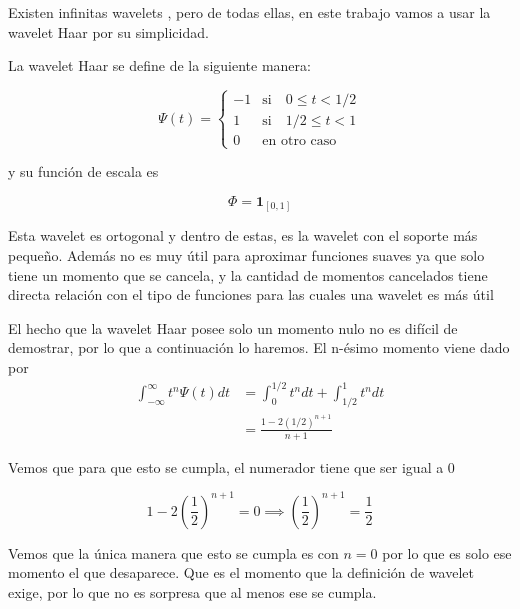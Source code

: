 \documentclass[conference]{IEEEtran}
\begin{document}
Existen infinitas wavelets   \cite{wavelettour}, pero de todas ellas, en este trabajo vamos a usar la wavelet Haar por su simplicidad.

La wavelet Haar se define de la siguiente manera:

\begin{equation}
  \Psi(t) = \begin{cases}
    -1 &\text{si}\quad 0\leq t<1/2\\
    1 &\text{si}\quad 1/2\leq t<1\\
    0 &\text{en otro caso}
\end{cases}
\end{equation}

y su función de escala es


\begin{equation}
  \Phi = \pmb{1}_{[0,1]}
\end{equation}

Esta wavelet es ortogonal \cite{wavelettour} y dentro de estas, es la wavelet con el soporte más pequeño. Además no es muy útil para aproximar funciones suaves ya que solo tiene un momento que se cancela, y la cantidad de momentos cancelados tiene directa relación con el tipo de funciones para las cuales una wavelet es más útil \cite{wavelettour}

El hecho que la wavelet Haar posee solo un momento nulo no es difícil de demostrar, por lo que a continuación lo haremos. El n-ésimo momento viene dado por
\begin{equation}
    \begin{aligned}
            \int_{-\infty}^\infty t^n \Psi(t)dt &= \int_0^{1/2}t^n dt + \int_{1/2}^1 t^n dt\\
         &=\frac{1-2(1/2)^{n+1}}{n+1}
    \end{aligned}
\end{equation}


Vemos que para que esto se cumpla, el numerador tiene que ser igual a 0

\begin{equation}
    1-2\left(\frac{1}{2}\right)^{n+1} = 0 \implies \left(\frac{1}{2}\right)^{n+1} = \frac{1}{2}
\end{equation}

Vemos que la única manera que esto se cumpla es con $n=0$ por lo que es solo ese momento el que desaparece. Que es el momento que la definición de wavelet exige, por lo que no es sorpresa que al menos ese se cumpla.
\end{document}
